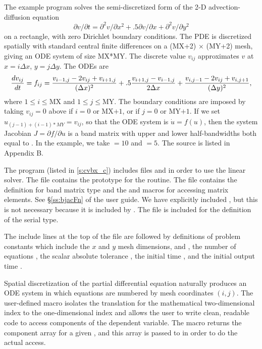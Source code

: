 The example program  solves the semi-discretized form
of the 2-D advection-diffusion equation
\begin{equation}
\label{eq:adeqn}
\partial v / \partial t = \partial^2 v / \partial x^2
  + .5 \partial v / \partial x + \partial^2 v / \partial y^2
\end{equation}
on a rectangle, with zero Dirichlet boundary conditions. The PDE is 
discretized spatially with standard central finite differences 
on a (MX+2) $\times$ (MY+2) mesh, giving an ODE system of size MX*MY.  
The discrete value $v_{ij}$ approximates $v$ at $x = i \Delta x$,
$y = j \Delta y$. The ODEs are
\begin{equation}
\label{eq:cdiff}
{{dv_{ij}} \over dt} = f_{ij} =
         {{v_{i-1,j} - 2 v_{ij} + v_{i+1,j}} \over {(\Delta x)^2}}
       + .5  {{v_{i+1,j} - v_{i-1,j}} \over {2 \Delta x}}
       + {{v_{i,j-1} - 2 v_{ij} + v_{i,j+1}} \over {(\Delta y)^2}},
\end{equation}
where $1 \leq i \leq $MX and $1 \leq j \leq $MY.  The boundary
conditions are imposed by taking $v_{ij} = 0$ above if $i = 0$
or MX$+1$, or if $j = 0$ or MY$+1$. 
If we set $u_{(j-1)+(i-1)*MY} = v_{ij}$, so that the ODE system is
$\dot{u} = f(u)$, then the system Jacobian $J = \partial f / \partial u$ is
a band matrix with upper and lower half-bandwidths both equal to .
In the example, we take  $= 10$ and  $= 5$.
The source is listed in Appendix B.

The  program  (listed in \A\ref{s:cvbx_c}) includes files  and
 in order to use the {\cvband} linear solver. The 
file contains the prototype for the  routine. The 
file contains the definition for band matrix type  and the
 and  macros for accessing matrix
elements. See \S\ref{ss:bjacFn} of the user guide.
We have explicitly included , but this is not necessary because
it is included by .  The file  is
included for the definition of the serial  type.

The include lines at the top of the file are followed by definitions of
problem constants which include the $x$ and $y$ mesh dimensions,  and
, the number of equations , the scalar absolute tolerance
, the initial time , and the initial output time .

Spatial discretization of the partial differential equation naturally
produces an ODE system in which equations are numbered by mesh
coordinates $(i,j)$. The user-defined macro  isolates the
translation for the mathematical two-dimensional index to the
one-dimensional  index and allows the user to write
clean, readable code to access components of the dependent variable. 
The  macro returns the component array for a given
, and this array is passed to  in order to do
the actual  access.

